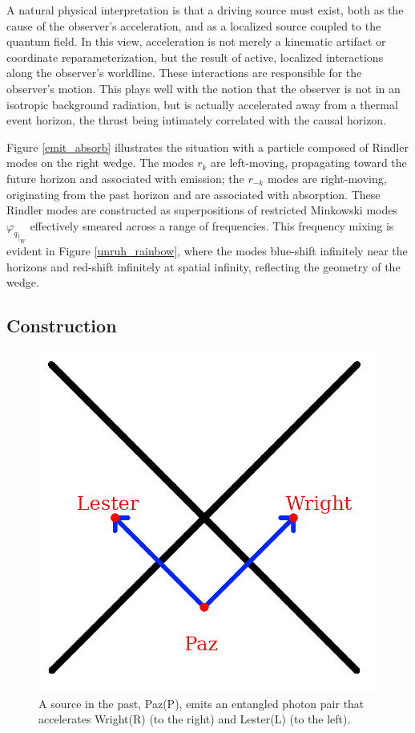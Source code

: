 \documentclass[12pt,a4paper]{article}
\begin{document}
A natural physical interpretation is that a driving source must exist, both as the cause of the observer’s acceleration, and as a localized source coupled to the quantum field. In this view, acceleration is not merely a kinematic artifact or coordinate reparameterization, but the result of active, localized interactions along the observer’s worldline. These interactions are responsible for the observer’s motion.  This plays well with the notion that the observer is not in an isotropic background radiation, but is actually accelerated away from a thermal event horizon, the thrust being intimately correlated with the causal horizon.


Figure \ref{emit_absorb} illustrates the situation with a particle composed of Rindler modes on the right wedge. The modes $r_k$ are left-moving, propagating toward the future horizon and associated with emission; the $r_{-k}$ modes are right-moving, originating from the past horizon and are associated with absorption. These Rindler modes are constructed as superpositions of restricted Minkowski modes ${\varphi_q}_{|_W}$ effectively smeared across a range of frequencies.  This frequency mixing is evident in Figure \ref{unruh_rainbow}, where the modes blue-shift infinitely near the horizons and red-shift infinitely at spatial infinity, reflecting the geometry of the wedge.

\subsection{Construction}

\begin{figure}[h]
\centering
\includegraphics[scale=0.75]{paz.png}
\captionsetup{width=0.7\textwidth}
\caption{A source in the past, Paz(P), emits an entangled photon pair that accelerates Wright(R) (to the right) and Lester(L) (to the left).}
\label{paz}
\end{figure}
\end{document}
